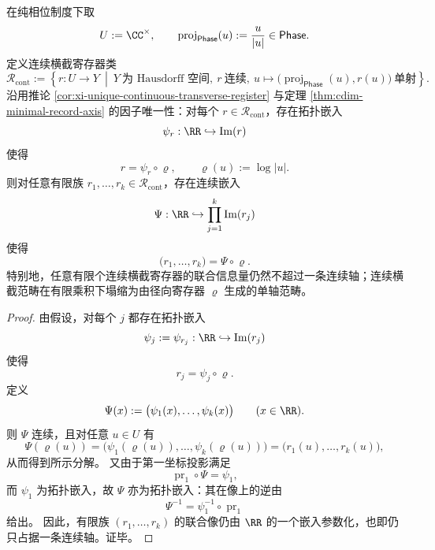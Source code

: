\begin{theorem}[连续横截寄存器范畴的单轴塌缩]\label{thm:conclusion-continuous-transverse-category-collapse}
在纯相位制度下取
\[
U:=\CC^\times,
\qquad
\operatorname{proj}_{\mathsf{Phase}}(u):=\frac{u}{|u|}\in\mathsf{Phase}.
\]
定义连续横截寄存器类
\[
\mathcal R_{\mathrm{cont}}
:=
\left\{
r:U\to Y\ \middle|\
Y\ \text{为 Hausdorff 空间},\ r\ \text{连续},\
u\mapsto\bigl(\operatorname{proj}_{\mathsf{Phase}}(u),r(u)\bigr)\ \text{单射}
\right\}.
\]
沿用推论 \ref{cor:xi-unique-continuous-transverse-register} 与定理 \ref{thm:cdim-minimal-record-axis} 的因子唯一性：对每个 \(r\in\mathcal R_{\mathrm{cont}}\)，存在拓扑嵌入
\[
\psi_r:\RR\hookrightarrow \operatorname{Im}(r)
\]
使得
\[
r=\psi_r\circ \varrho,
\qquad
\varrho(u):=\log|u|.
\]
则对任意有限族 \(r_1,\dots,r_k\in\mathcal R_{\mathrm{cont}}\)，存在连续嵌入
\[
\Psi:\RR\hookrightarrow \prod_{j=1}^k \operatorname{Im}(r_j)
\]
使得
\[
\boxed{\;
\bigl(r_1,\dots,r_k\bigr)=\Psi\circ \varrho.\;}
\]
特别地，任意有限个连续横截寄存器的联合信息量仍然不超过一条连续轴；连续横截范畴在有限乘积下塌缩为由径向寄存器 \(\varrho\) 生成的单轴范畴。
\end{theorem}
\begin{proof}
由假设，对每个 \(j\) 都存在拓扑嵌入
\[
\psi_j:=\psi_{r_j}:\RR\hookrightarrow \operatorname{Im}(r_j)
\]
使得
\[
r_j=\psi_j\circ \varrho.
\]
定义
\[
\Psi(x):=\bigl(\psi_1(x),\dots,\psi_k(x)\bigr)
\qquad
(x\in\RR).
\]
则 \(\Psi\) 连续，且对任意 \(u\in U\) 有
\[
\Psi(\varrho(u))
=
\bigl(\psi_1(\varrho(u)),\dots,\psi_k(\varrho(u))\bigr)
=
\bigl(r_1(u),\dots,r_k(u)\bigr),
\]
从而得到所示分解。
又由于第一坐标投影满足
\[
\operatorname{pr}_1\circ \Psi=\psi_1,
\]
而 \(\psi_1\) 为拓扑嵌入，故 \(\Psi\) 亦为拓扑嵌入：其在像上的逆由
\[
\Psi^{-1}=\psi_1^{-1}\circ \operatorname{pr}_1
\]
给出。
因此，有限族 \((r_1,\dots,r_k)\) 的联合像仍由 \(\RR\) 的一个嵌入参数化，也即仍只占据一条连续轴。证毕。
\end{proof}

